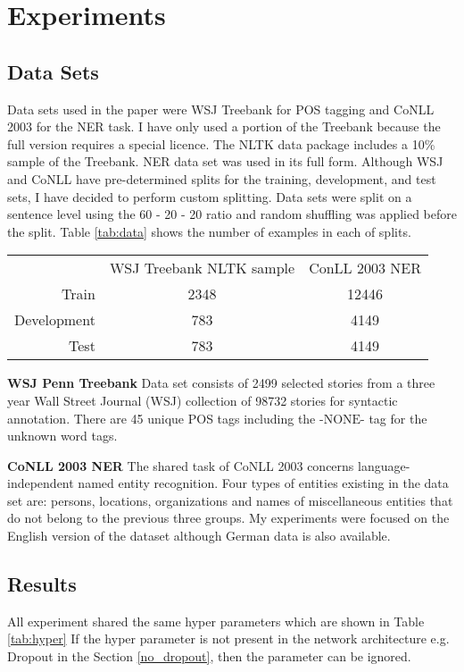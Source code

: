 \section{Experiments}

\subsection{Data Sets}
Data sets used in the paper were WSJ Treebank for POS tagging and CoNLL 2003
for the NER task. I have only used a portion of the Treebank because
the full version requires a special licence. The NLTK data package includes a
10\% sample of the Treebank. NER data set was used in its full form.
Although WSJ and CoNLL have pre-determined splits for the training,
development, and test sets, I have decided to perform custom splitting.
Data sets were split on a sentence level using the 60 - 20 - 20 ratio
and random shuffling was applied before the split. Table \ref{tab:data} shows
the number of examples in each of splits.

\begin{center}
\begin{tabular}{ r|c|c| }
\multicolumn{1}{r}{}
 &  \multicolumn{1}{c}{WSJ Treebank NLTK sample}
 & \multicolumn{1}{c}{ConLL 2003 NER} \\
\cline{2-3}
Train & 2348 & 12446 \\
\cline{2-3}
Development & 783 & 4149 \\
\cline{2-3}
Test & 783 & 4149 \\
\cline{2-3}
\end{tabular}
\label{tab:data}
\end{center}


\textbf{WSJ Penn Treebank}
Data set consists of 2499 selected stories from a three year Wall Street
Journal (WSJ) collection of 98732 stories for syntactic annotation. There are
45 unique POS tags including the $\text{-NONE-}$ tag for the unknown word tags. 

\textbf{CoNLL 2003 NER}
The shared task of CoNLL 2003 concerns language-independent named entity
recognition. Four types of entities existing in the data set are: persons,
locations, organizations and names of miscellaneous entities that do not belong
to the previous three groups. My experiments were focused on the English
version of the dataset although German data is also available.

\subsection{Results}
All experiment shared the same hyper parameters which are shown in Table
\ref{tab:hyper} If the hyper parameter is not present in the network
architecture e.g. Dropout in the Section \ref{no_dropout}, then the parameter
can be ignored.

